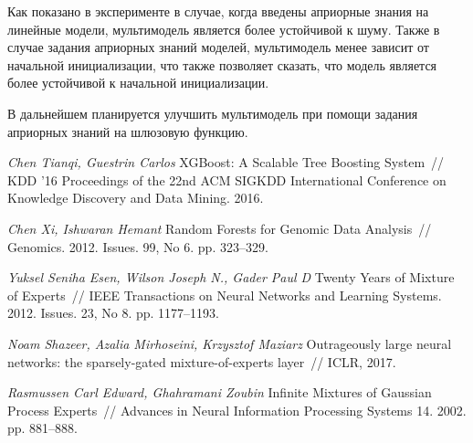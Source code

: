 \documentclass[12pt, twoside]{article}
\numberwithin{equation}{section}
\begin{document}
Как показано в эксперименте в случае, когда введены априорные знания на линейные модели, мультимодель является более устойчивой к шуму. Также в случае задания априорных знаний моделей, мультимодель менее зависит от начальной инициализации, что также позволяет сказать, что модель является более устойчивой к начальной инициализации.

В дальнейшем планируется улучшить мультимодель при помощи задания априорных знаний на шлюзовую функцию.

\begin{thebibliography}{99}
	\textit{Chen Tianqi, Guestrin Carlos} XGBoost: A Scalable Tree Boosting System~// KDD ’16 Proceedings of the 22nd ACM SIGKDD International Conference on Knowledge Discovery and Data Mining. 2016.
	
	\textit{Chen Xi, Ishwaran Hemant} Random Forests for Genomic Data Analysis~// Genomics. 2012. Issues. 99, No 6. pp. 323--329.

	\textit{Yuksel Seniha Esen, Wilson Joseph N., Gader Paul D} Twenty Years of Mixture of Experts~// IEEE Transactions on Neural Networks and Learning Systems. 2012. Issues. 23, No 8. pp. 1177–1193.

	\textit{Noam Shazeer, Azalia Mirhoseini, Krzysztof Maziarz} Outrageously large neural networks: the sparsely-gated mixture-of-experts layer~// ICLR, 2017.

	\textit{Rasmussen Carl Edward, Ghahramani Zoubin} Infinite Mixtures of Gaussian Process Experts~// Advances in Neural Information Processing Systems 14. 2002. pp. 881–888.


 \end{thebibliography}
\end{document}
